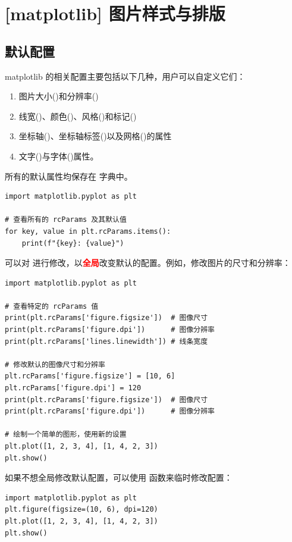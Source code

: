 \chapter{[matplotlib] 图片样式与排版}
\section{默认配置}
matplotlib 的相关配置主要包括以下几种，用户可以自定义它们：
\begin{enumerate}[label=\arabic*)]
    \item 图片大小()和分辨率()
    \item 线宽()、颜色()、风格()和标记()
    \item 坐标轴()、坐标轴标签()以及网格()的属性
    \item 文字()与字体()属性。
\end{enumerate}

所有的默认属性均保存在  字典中。
\begin{lstlisting}[style=pythonstyle]
import matplotlib.pyplot as plt

# 查看所有的 rcParams 及其默认值
for key, value in plt.rcParams.items():
    print(f"{key}: {value}")
\end{lstlisting}    

可以对  进行修改，以\textcolor{red}{\textbf{全局}}改变默认的配置。例如，修改图片的尺寸和分辨率：
\begin{lstlisting}[style=pythonstyle]
import matplotlib.pyplot as plt

# 查看特定的 rcParams 值
print(plt.rcParams['figure.figsize'])  # 图像尺寸
print(plt.rcParams['figure.dpi'])      # 图像分辨率
print(plt.rcParams['lines.linewidth']) # 线条宽度

# 修改默认的图像尺寸和分辨率
plt.rcParams['figure.figsize'] = [10, 6]
plt.rcParams['figure.dpi'] = 120
print(plt.rcParams['figure.figsize'])  # 图像尺寸
print(plt.rcParams['figure.dpi'])      # 图像分辨率

# 绘制一个简单的图形，使用新的设置
plt.plot([1, 2, 3, 4], [1, 4, 2, 3])
plt.show()
\end{lstlisting}   

如果不想全局修改默认配置，可以使用  函数来临时修改配置：
\begin{lstlisting}[style=pythonstyle]
import matplotlib.pyplot as plt  
plt.figure(figsize=(10, 6), dpi=120)  
plt.plot([1, 2, 3, 4], [1, 4, 2, 3])
plt.show()
\end{lstlisting}

